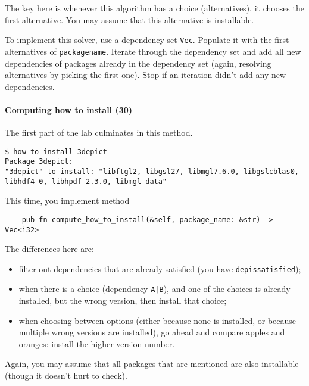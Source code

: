 \documentclass[12pt]{article}
\renewcommand{\_}{\kern-1.5pt\textunderscore\kern-1.5pt}
\begin{document}
The key here is whenever this algorithm has a choice (alternatives), it chooses the first
alternative. You may assume that this alternative is installable.

\vspace{1em}
To implement this solver, use a dependency set \texttt{Vec}. Populate
it with the first alternatives of \texttt{package\_name}. Iterate
through the dependency set and add all new dependencies of packages
already in the dependency set (again, resolving alternatives by
picking the first one). Stop if an iteration didn't add any new
dependencies.



\paragraph{Computing how to install (30)}

The first part of the lab culminates in this method.
{\scriptsize
\begin{verbatim}
$ how-to-install 3depict
Package 3depict:
"3depict" to install: "libftgl2, libgsl27, libmgl7.6.0, libgslcblas0, libhdf4-0, libhpdf-2.3.0, libmgl-data"
\end{verbatim}
}

This time, you implement method
\begin{verbatim}
    pub fn compute_how_to_install(&self, package_name: &str) -> Vec<i32>
\end{verbatim}
The differences here are:
\begin{itemize}
\item filter out dependencies that are already satisfied (you have \texttt{dep\_is\_satisfied});
\item when there is a choice (dependency \texttt{A|B}), and one of the choices is already installed, but the wrong version, then install that choice;
\item when choosing between options (either because none is installed, or because multiple wrong versions are installed), go ahead and compare apples and oranges: install the higher version number.
\end{itemize}
Again, you may assume that all packages that are mentioned are also installable (though it doesn't hurt to check).
\end{document}
